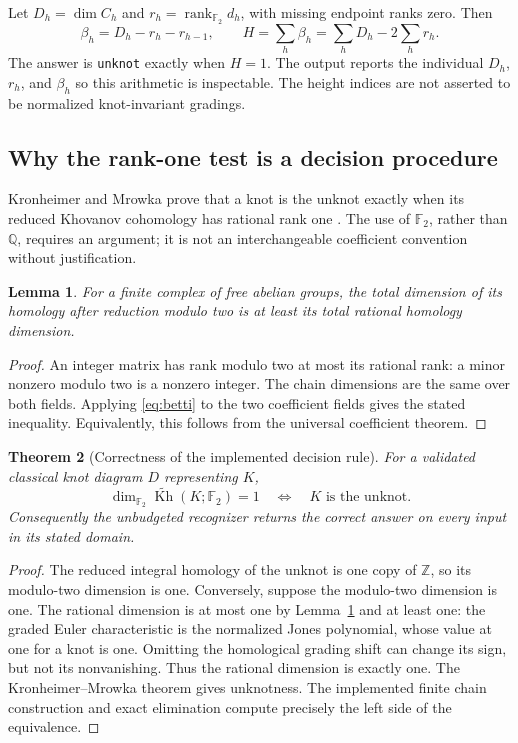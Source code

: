 \documentclass[11pt]{article}
\newtheorem{theorem}{Theorem}[section]
\newtheorem{lemma}[theorem]{Lemma}
\theoremstyle{definition}\newtheorem{definition}[theorem]{Definition}
\newcommand{\F}{\mathbb F_2}
\newcommand{\Q}{\mathbb Q}
\newcommand{\Z}{\mathbb Z}
\newcommand{\Kh}{\widetilde{\operatorname{Kh}}}
\begin{document}
Let $D_h=\dim C_h$ and $r_h=\operatorname{rank}_{\F}d_h$, with missing endpoint
ranks zero. Then
\begin{equation}\label{eq:betti}
 \beta_h=D_h-r_h-r_{h-1},\qquad
 H=\sum_h\beta_h=\sum_hD_h-2\sum_hr_h.
\end{equation}
The answer is \texttt{unknot} exactly when $H=1$. The output reports the
individual $D_h$, $r_h$, and $\beta_h$ so this arithmetic is inspectable.
The height indices are not asserted to be normalized knot-invariant gradings.

\subsection{Why the rank-one test is a decision procedure}

Kronheimer and Mrowka prove that a knot is the unknot exactly when its reduced
Khovanov cohomology has rational rank one \cite{kronheimermrowka}. The use of
$\F$, rather than $\Q$, requires an argument; it is not an interchangeable
coefficient convention without justification.

\begin{lemma}\label{lem:field}
For a finite complex of free abelian groups, the total dimension of its
homology after reduction modulo two is at least its total rational homology
dimension.
\end{lemma}
\begin{proof}
An integer matrix has rank modulo two at most its rational rank: a minor
nonzero modulo two is a nonzero integer. The chain dimensions are the same
over both fields. Applying \eqref{eq:betti} to the two coefficient fields gives
the stated inequality. Equivalently, this follows from the universal
coefficient theorem.
\end{proof}

\begin{theorem}[Correctness of the implemented decision rule]
For a validated classical knot diagram $D$ representing $K$,
\[
 \dim_{\F}\Kh(K;\F)=1\quad\Longleftrightarrow\quad K\text{ is the unknot}.
\]
Consequently the unbudgeted recognizer returns the correct answer on every
input in its stated domain.
\end{theorem}
\begin{proof}
The reduced integral homology of the unknot is one copy of $\Z$, so its
modulo-two dimension is one. Conversely, suppose the modulo-two dimension is
one. The rational dimension is at most one by Lemma~\ref{lem:field} and at least
one: the graded Euler characteristic is the normalized Jones polynomial, whose
value at one for a knot is one. Omitting the homological grading shift can
change its sign, but not its nonvanishing. Thus the rational dimension is
exactly one. The Kronheimer--Mrowka theorem gives unknotness. The implemented
finite chain construction and exact elimination compute precisely the left
side of the equivalence.
\end{proof}
\end{document}
